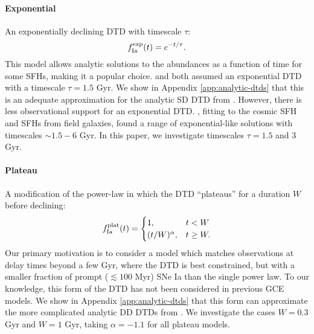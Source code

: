 \documentclass[twocolumn,twocolappendix,linenumbers]{aastex631}
\begin{document}
\paragraph{Exponential} An exponentially declining DTD with timescale $\tau$:
\begin{equation}
    f_{\rm Ia}^{\rm exp}(t) = e^{-t/\tau}.
    \label{eq:exponential-dtd}
\end{equation}
This model allows analytic solutions to the abundances as a function of time for some SFHs, making it a popular choice. \citet{Schonrich2009-RadialMixing} and \citet{Weinberg2017-ChemicalEquilibrium} both assumed an exponential DTD with a timescale $\tau=1.5$ Gyr. We show in Appendix \ref{app:analytic-dtds} that this is an adequate approximation for the analytic SD DTD from \citet{Greggio2005-AnalyticalRates}. 
However, there is less observational support for an exponential DTD. \citet{Strolger2020-ExponentialDTD}, fitting to the cosmic SFH and SFHs from field galaxies, found a range of exponential-like solutions with timescales $\sim 1.5 - 6$ Gyr.
In this paper, we investigate timescales $\tau=1.5$ and 3 Gyr.

\paragraph{Plateau} A modification of the power-law in which the DTD ``plateaus'' for a duration $W$ before declining:
\begin{equation}
    f_{\rm Ia}^{\rm plat}(t) =
    \begin{cases}
        1, & t < W \\
        (t/W)^\alpha, & t \ge W.
    \end{cases}
    \label{eq:plateau-dtd}
\end{equation}
Our primary motivation is to consider a model which matches observations at delay times beyond a few Gyr, where the DTD is best constrained, but with a smaller fraction of prompt ($\lesssim 100$ Myr) SNe Ia than the single power law.
To our knowledge, this form of the DTD has not been considered in previous GCE models. We show in Appendix \ref{app:analytic-dtds} that this form can approximate the more complicated analytic DD DTDs from \citet{Greggio2005-AnalyticalRates}. We investigate the cases $W=0.3$ Gyr and $W=1$ Gyr, taking $\alpha=-1.1$ for all plateau models.
\end{document}
